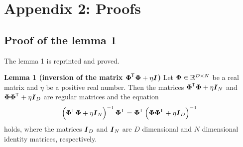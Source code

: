 \documentclass[twocolumn,a4paper,10pt]{article}
\begin{document}

\section{Appendix 2: Proofs}\titlebar

\subsection{Proof of the lemma 1}

The lemma 1 is reprinted and proved.

\vspace*{6pt}
\begin{thmbox}[M]{\bfseries{Lemma 1} (inversion of the matrix $\boldsymbol{\Phi}^{\mkern-1.5mu\mathsf{T}}\hspace{0.5pt} \boldsymbol{\Phi} + \eta \boldsymbol{I}$)}
    Let $\boldsymbol{\Phi} \in \mathbb{R}^{D \times N}$ be a real matrix and $\eta$ be a positive real number.
    Then the matrices $\boldsymbol{\Phi}^{\mkern-1.5mu\mathsf{T}}\hspace{0.5pt} \boldsymbol{\Phi} + \eta \boldsymbol{I}_N$ and $\boldsymbol{\Phi} \boldsymbol{\Phi}^{\mkern-1.5mu\mathsf{T}}\hspace{0.5pt} + \eta \boldsymbol{I}_D$
    are regular matrices and the equation
    \begin{equation}
        \left( \boldsymbol{\Phi}^{\mkern-1.5mu\mathsf{T}}\hspace{0.5pt} \boldsymbol{\Phi} + \eta \boldsymbol{I}_N \right)^{-1} \boldsymbol{\Phi}^{\mkern-1.5mu\mathsf{T}}\hspace{0.5pt}
        = \boldsymbol{\Phi}^{\mkern-1.5mu\mathsf{T}}\hspace{0.5pt} \left( \boldsymbol{\Phi} \boldsymbol{\Phi}^{\mkern-1.5mu\mathsf{T}}\hspace{0.5pt} + \eta \boldsymbol{I}_D \right)^{-1}
    \end{equation}
    holds, where the matrices $\boldsymbol{I}_D$ and $\boldsymbol{I}_N$ are $D$ dimensional and $N$ dimensional
    identity matrices, respectively.
\end{thmbox}
\vspace*{4pt}
\end{document}
